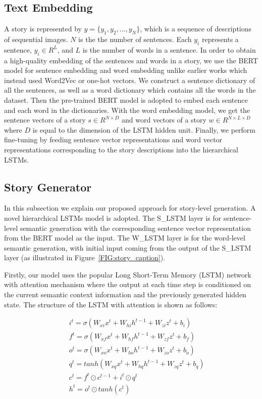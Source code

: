 \documentclass[a4paper,fleqn]{cas-sc}
\begin{document}
\subsection{Text Embedding}
A story is represented by $y = \{y_1,y_2,…, y_N\}$, which is a sequence of   descriptions of sequential images. $N$ is the the number of sentences. Each $y_i$ represents a sentence,  $y_i \in R^L$,  and $L$ is the number of words in a sentence. In order to obtain a high-quality embedding of the sentences and words in a story, we use the BERT model for sentence embedding and word embedding unlike earlier works which instead used Word2Vec or one-hot vectors. We  construct a sentence dictionary of all the sentences, as well as a word dictionary which contains all the words in the dataset. Then the pre-trained BERT model is adopted to embed each sentence and each word in the dictionaries. With the word embedding model, we get the sentence vectors of a story $s \in R^{N \times D}$ and word vectors of a story $w \in R^{N \times L \times D }$ where $D$ is equal to the dimension of the LSTM hidden unit. Finally, we perform fine-tuning by feeding sentence vector representations and word vector representations corresponding to the story descriptions into the hierarchical LSTMs.

\subsection{Story Generator}
In this subsection we explain our proposed approach for story-level generation. A novel hierarchical LSTMs model is adopted. The S\_LSTM layer is for sentence-level semantic generation with the corresponding sentence vector representation from the BERT model as the input. The W\_LSTM layer is for the word-level semantic generation, with initial input coming from the output of the S\_LSTM layer (as illustrated in Figure~\ref{FIG:story_caption}).

Firstly, our model uses the popular Long Short-Term Memory (LSTM) network with attention mechanism \citep{Xu2015Show} where the  output at each time step is conditioned on the current semantic context information and the previously generated hidden state. The structure of the LSTM with attention is shown as follows:

\begin{eqnarray}
&& i^t = \sigma(W_{xi}x^t+W_{hi}h^{t-1}+W_{zi}z^t+b_i) \nonumber\\
&& f^t = \sigma(W_{xf}x^t+W_{hf}h^{t-1}+W_{zf}z^t+b_f) \nonumber\\
&& o^t = \sigma(W_{xo}x^t+W_{ho}h^{t-1}+W_{zo}z^t+b_o) \nonumber\\
&& q^t = \mathit{tanh}(W_{xq}x^t+W_{hq}h^{t-1}+W_{zq}z^t+b_q) \nonumber\\
&& c^t = f^t \odot c^{t-1} + i^t \odot q^t \nonumber\\
&& h^t = o^t\odot \mathit{tanh}(c^t) \label{eq3}
\end{eqnarray}
\end{document}
